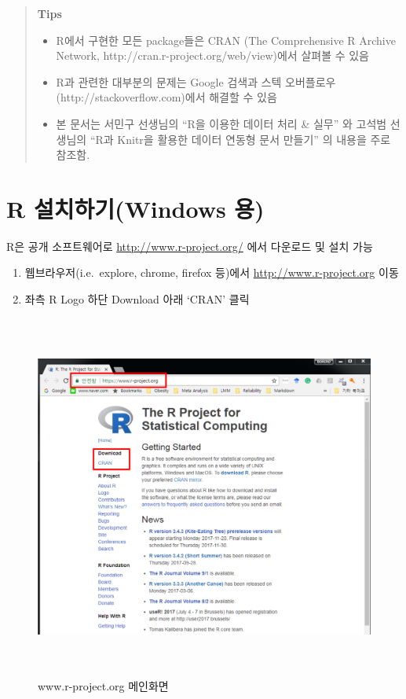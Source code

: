 \documentclass[12pt,a4paper]{book}
\providecommand{\tightlist}{%
  \setlength{\itemsep}{0pt}\setlength{\parskip}{0pt}}
\begin{document}
\begin{quote}
\colorbox{gray!10}{\begin{minipage}{15cm}
\textbf{Tips}
  \begin{itemize}
    \item R에서 구현한 모든 package들은 CRAN (The Comprehensive R Archive Network, http://cran.r-project.org/web/view)에서 살펴볼 수 있음
    \item R과 관련한 대부분의 문제는 Google 검색과 스텍 오버플로우(http://stackoverflow.com)에서 해결할 수 있음
    \item 본 문서는 서민구 선생님의 ``R을 이용한 데이터 처리 \& 실무'' \citep{Seo-2014} 와 고석범 선생님의 ``R과 Knitr을 활용한 데이터 연동형 문서 만들기'' \citep{Ko-2014} 의 내용을 주로 참조함. 
  \end{itemize}
\end{minipage}}
\end{quote}

\newpage

\section{R 설치하기(Windows 용)}\label{r-windows-}

R은 공개 소프트웨어로 \url{http://www.r-project.org/} 에서 다운로드 및
설치 가능

\begin{enumerate}
\def\labelenumi{\arabic{enumi}.}
\tightlist
\item
  웹브라우저(i.e.~explore, chrome, firefox 등)에서
  \url{http://www.r-project.org} 이동
\item
  좌측 R Logo 하단 Download 아래 `CRAN' 클릭
\end{enumerate}

\begin{figure}[h]
{
  \centering
  \includegraphics[width = 12cm, height = 12cm]{Figures/Rorg-main-add.png}
  \caption[www.r-project.org 메인화면]{www.r-project.org 메인화면}\label{fig:R-install-01}
}
\end{figure}
\end{document}
